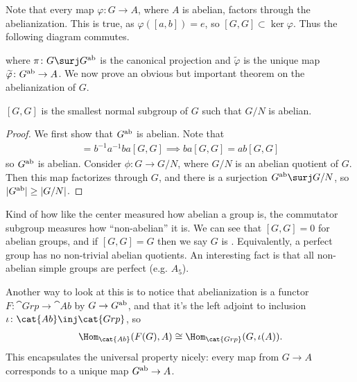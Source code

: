 \documentclass[11pt]{article}
\begin{document}
Note that every map $\varphi \colon G \to A$, where $A$ is abelian,
factors through the abelianization. This is true, as $\varphi([a, b]) = e$,
so $[G, G] \subset \ker{\varphi}$. Thus the following 
diagram commutes.


\begin{center}
\end{center}
\noin
where $\pi \colon G \surj G^{\rm ab}$ is the canonical
projection and $\widetilde{\varphi}$ is the unique map $\widetilde{\varphi}
\colon G^{\rm ab} \to A$. We now prove an obvious but important theorem on the 
abelianization of $G$.

\begin{theorem}
    $[G, G]$ is the smallest normal subgroup of $G$ such that $G/N$ is abelian.
\end{theorem}

\begin{proof}
    We first show that $G^{\rm ab}$ is abelian. Note that
    \begin{align*}
        [G, G] = b^{-1} a^{-1} b a [G, G] \implies ba [G, G] = ab [G, G]
    \end{align*}
    so $G^{\rm ab}$ is abelian. Consider $\phi \colon G \to G/N$, where
    $G/N$ is an abelian quotient of $G$. Then this map factorizes through
    $G$, and there is a surjection $G^{\rm ab} \surj G/N$, so 
    $|G^{\rm ab}| \geq |G/N|$. 
\end{proof}

Kind of how like the center measured how abelian a group is, the commutator
subgroup measures how ``non-abelian'' it is. We can see that $[G, G] = 0$
for abelian groups, and if $[G, G] = G$ then we say $G$ is .
Equivalently, a perfect group has no non-trivial abelian quotients. An interesting
fact is that all non-abelian simple groups are perfect (e.g. $A_5$).

Another way to look at this is to notice that abelianization is a
functor $F \colon \cat{Grp} \to \cat{Ab}$ by $G \to G^{\rm ab}$, 
and that it's the left adjoint to inclusion $\iota \colon \cat{Ab} \inj \cat{Grp}$, so
\begin{align*}
    \Hom_{\cat{Ab}}(F(G), A) \cong \Hom_{\cat{Grp}}(G, \iota(A)).
\end{align*}
This encapsulates the universal property nicely: every map from
$G \to A$ corresponds to a unique map $G^{\rm ab} \to A$. 
\end{document}
